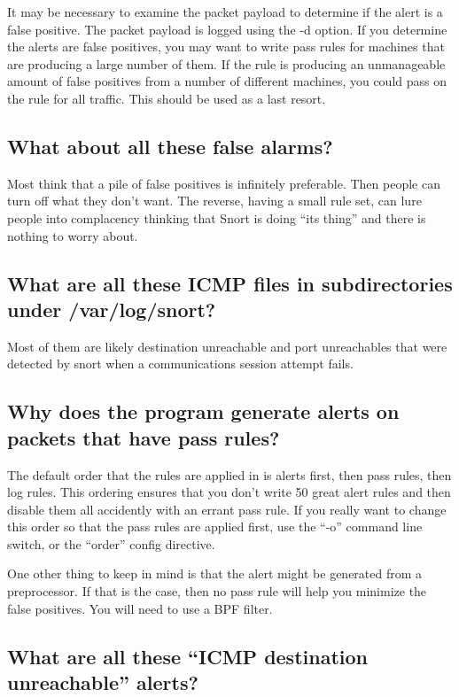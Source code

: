 \documentclass{article}
\begin{document}
It may be necessary to examine the packet payload to determine if the
alert is a false positive.  The packet payload is logged using the -d
option.  If you determine the alerts are false positives, you may want
to write pass rules for machines that are producing a large number of them.
If the rule is producing an unmanageable amount of false positives from
a number of different machines, you could pass on the rule for all traffic.
This should be used as a last resort.

\subsection{What about all these false alarms? }

Most think that a pile of false positives is infinitely preferable. Then
people can turn off what they don't want. The reverse, having a small rule
set, can lure people into complacency thinking that Snort is doing ``its
thing'' and there is nothing to worry about.
 

\subsection{What are all these ICMP files in subdirectories under /var/log/snort? }

Most of them are likely destination unreachable and port unreachables that
were detected by snort when a communications session attempt fails.


\subsection{Why does the program generate alerts on packets that have pass rules?  }

The default order that the rules are applied in is alerts first, then pass
rules, then log rules. This ordering ensures that you don't write 50 great
alert rules and then disable them all accidently with an errant pass rule. If
you really want to change this order so that the pass rules are applied first,
use the ``-o'' command line switch, or the ``order'' config directive.

One other thing to keep in mind is that the alert might be generated from a
preprocessor. If that is the case, then no pass rule will help you minimize the
false positives. You will need to use a BPF filter. 

\subsection{What are all these ``ICMP destination unreachable'' alerts? }
\end{document}
